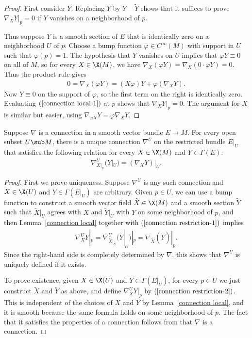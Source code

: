 \begin{proof}
First consider $Y$. Replacing $Y$ by $Y-\widetilde{Y}$ shows that it suffices to prove $\nabla_XY|_p=0$ if $Y$ vanishes on a neighborhood of $p$.\par
Thus suppose $Y$ is a smooth section of $E$ that is identically zero on a neighborhood $U$ of $p$. Choose a bump function $\varphi\in C^{\infty}(M)$ with support in $U$ such that $\varphi(p)=1$. The hypothesis that $Y$ vanishes on $U$ implies that $\varphi Y\equiv 0$ on all of $M$, so for every $X\in\X(M)$, we have $\nabla_X(\varphi Y)=\nabla_X(0\cdot\varphi Y)=0$. Thus the product rule gives
\begin{align}\label{connection local-1}
0=\nabla_X(\varphi Y)=(X\varphi)Y+\varphi(\nabla_XY).
\end{align}
Now $Y\equiv 0$ on the support of $\varphi$, so the first term on the right is identically zero. Evaluating $(\ref{connection local-1})$ at $p$ shows that $\nabla_XY|_p=0$. The argument for $X$ is similar but easier, using $\nabla_{\varphi X}Y=\varphi\nabla_XY$.
\end{proof}
\begin{proposition}\label{connection restriction}
Suppose $\nabla$ is a connection in a smooth vector bundle $E\to M$. For every open subset $U\sub M$, there is a unique 
connection $\nabla^U$ on the restricted bundle $E|_U$ that satisfies the following relation for every $X\in\X(M)$ and $Y\in\Gamma(E)$:
\begin{align}\label{connection restriction-1}
\nabla^U_{X|_U}(Y|_U)=(\nabla_XY)|_U.
\end{align}
\end{proposition}
\begin{proof}
First we prove uniqueness. Suppose $\nabla^U$ is any such connection and $X\in\X(U)$ and $Y\in\Gamma(E|_U)$ are arbitrary. Given $p\in U$, we can use a bump function to construct a smooth vector field $\widetilde{X}\in\X(M)$ and a smooth section $\widetilde{Y}$ such that $\widetilde{X}|_U$ agrees with $X$ and $\widetilde{Y}|_U$ with $Y$ on some neighborhood of $p$, and then Lemma~\ref{connection local} together with $(\ref{connection restriction-1})$ implies
\begin{align}\label{connection restriction-2}
\nabla^U_XY|_p=\nabla^U_{\widetilde{X}|_U}(\widetilde{Y}|_U)|_p=\nabla_{\widetilde{X}}(\widetilde{Y})|_p.
\end{align}
Since the right-hand side is completely determined by $\nabla$, this shows that $\nabla^U$ is uniquely defined if it exists.\par
To prove existence, given $X\in\X(U)$ and $Y\in\Gamma(E|_U)$, for every $p\in U$ we just construct $\widetilde{X}$ and $\widetilde{Y}$ as above, and define $\nabla_X^UY|_p$ by $(\ref{connection restriction-2})$. This is independent of the choices of $\widetilde{X}$ and $\widetilde{Y}$ by Lemma~\ref{connection local}, and it is smooth because the same formula holds on some neighborhood of $p$. The fact that it satisfies the properties of a connection follows from that $\nabla$ is a connection.
\end{proof}
